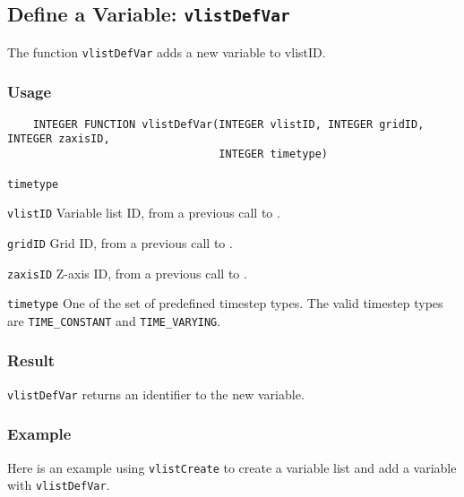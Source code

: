 

\subsection{Define a Variable: \texttt{vlistDefVar}}
\label{vlistDefVar}

The function {\texttt{vlistDefVar}} adds a new variable to vlistID.

\subsubsection*{Usage}

\begin{verbatim}
    INTEGER FUNCTION vlistDefVar(INTEGER vlistID, INTEGER gridID, INTEGER zaxisID, 
                                 INTEGER timetype)
\end{verbatim}

\hspace*{4mm}\begin{minipage}[]{15cm}
\begin{deflist}{\texttt{timetype}\ }
\item[\texttt{vlistID}]
Variable list ID, from a previous call to {}.
\item[\texttt{gridID}]
Grid ID, from a previous call to {}.
\item[\texttt{zaxisID}]
Z-axis ID, from a previous call to {}.
\item[\texttt{timetype}]
One of the set of predefined {\CDI} timestep types.
                     The valid {\CDI} timestep types are {\texttt{TIME\_CONSTANT}} and {\texttt{TIME\_VARYING}}.

\end{deflist}
\end{minipage}

\subsubsection*{Result}

{\texttt{vlistDefVar}} returns an identifier to the new variable.


\subsubsection*{Example}

Here is an example using {\texttt{vlistCreate}} to create a variable list
and add a variable with {\texttt{vlistDefVar}}.

